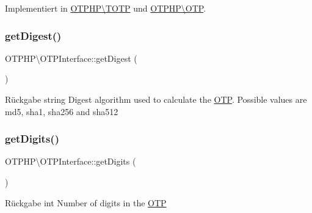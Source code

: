 Implementiert in \mbox{\hyperlink{class_o_t_p_h_p_1_1_t_o_t_p_a22513da78ec8fd1009910bc8f9a676f0}{O\+T\+P\+H\+P\textbackslash{}\+T\+O\+TP}} und \mbox{\hyperlink{class_o_t_p_h_p_1_1_o_t_p_a617f9d7e43bbea2ff1528ca41b647629}{O\+T\+P\+H\+P\textbackslash{}\+O\+TP}}.

\mbox{\label{interface_o_t_p_h_p_1_1_o_t_p_interface_afc5e0641afee53f57d7f9e97f65aa4e1}} 
\subsubsection{\texorpdfstring{get\+Digest()}{getDigest()}}
{\footnotesize\ttfamily O\+T\+P\+H\+P\textbackslash{}\+O\+T\+P\+Interface\+::get\+Digest (\begin{DoxyParamCaption}{ }\end{DoxyParamCaption})}

\begin{DoxyReturn}{Rückgabe}
string Digest algorithm used to calculate the \mbox{\hyperlink{class_o_t_p_h_p_1_1_o_t_p}{O\+TP}}. Possible values are \textquotesingle{}md5\textquotesingle{}, \textquotesingle{}sha1\textquotesingle{}, \textquotesingle{}sha256\textquotesingle{} and \textquotesingle{}sha512\textquotesingle{} 
\end{DoxyReturn}
\mbox{\label{interface_o_t_p_h_p_1_1_o_t_p_interface_a7f449d46d42dd559ad6a0aa1deb3b2c0}} 
\subsubsection{\texorpdfstring{get\+Digits()}{getDigits()}}
{\footnotesize\ttfamily O\+T\+P\+H\+P\textbackslash{}\+O\+T\+P\+Interface\+::get\+Digits (\begin{DoxyParamCaption}{ }\end{DoxyParamCaption})}

\begin{DoxyReturn}{Rückgabe}
int Number of digits in the \mbox{\hyperlink{class_o_t_p_h_p_1_1_o_t_p}{O\+TP}} 
\end{DoxyReturn}
\mbox{\label{interface_o_t_p_h_p_1_1_o_t_p_interface_a8b532c6c1ea3bbbe61b6719f875bc959}} 
